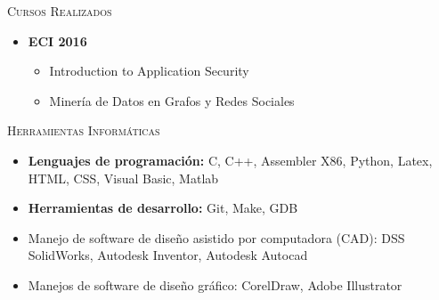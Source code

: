 \textsc{Cursos Realizados}
\begin{itemize}
    \item \textbf{ECI 2016} 
        \begin{itemize}
            \item Introduction to Application Security
            \item Minería de Datos en Grafos y Redes Sociales
        \end{itemize}
\end{itemize}

\textsc{Herramientas Informáticas}
\begin{itemize}
    \item \textbf{Lenguajes de programación: } C, C++, Assembler X86, Python, Latex, HTML, CSS,
        Visual Basic, Matlab
    \item \textbf{Herramientas de desarrollo: } Git, Make, GDB
    \item Manejo de software de diseño asistido por computadora (CAD): DSS SolidWorks, Autodesk
        Inventor, Autodesk Autocad
    \item Manejos de software de diseño gráfico: CorelDraw, Adobe Illustrator
\end{itemize}
